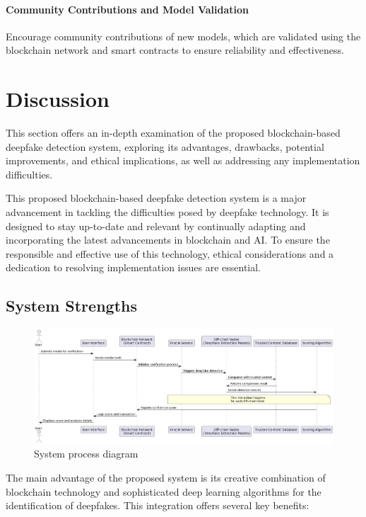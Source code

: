 \documentclass{article}
\begin{document}
\paragraph{Community Contributions and Model Validation} Encourage community contributions of new models, which are validated using the blockchain network and smart contracts to ensure reliability and effectiveness.

\section{Discussion}

This section offers an in-depth examination of the proposed blockchain-based deepfake detection system, exploring its advantages, drawbacks, potential improvements, and ethical implications, as well as addressing any implementation difficulties.

This proposed blockchain-based deepfake detection system is a major advancement in tackling the difficulties posed by deepfake technology. It is designed to stay up-to-date and relevant by continually adapting and incorporating the latest advancements in blockchain and AI. To ensure the responsible and effective use of this technology, ethical considerations and a dedication to resolving implementation issues are essential.

\subsection{System Strengths}

\begin{figure}
	\centering
        \includegraphics[width=15cm]{diagram1.png}
        \caption{System process diagram}
	\label{fig:fig3}
\end{figure}

The main advantage of the proposed system is its creative combination of blockchain technology and sophisticated deep learning algorithms for the identification of deepfakes. This integration offers several key benefits:
\end{document}
